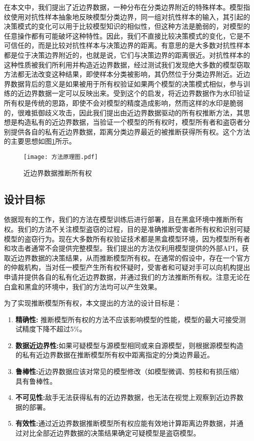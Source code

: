 在本文中，我们提出了近边界数据，一种分布在分类边界附近的特殊样本。模型指纹\cite{cao2021ipguard}使用对抗性样本抽象地反映模型分类边界，同一组对抗性样本的输入，其引起的决策模式的变化可以用于比较模型知识的相似性，但这种方法是脆弱的，对模型的任意操作都有可能破坏这种特性。因此，我们不直接比较决策模式的变化，它是不可信任的，而是比较对抗性样本与决策边界的距离。有意思的是大多数对抗性样本都是位于决策边界附近的，也就是说，它们与决策边界的距离很近。对抗性样本的这种性质被我们所利用并构造近边界数据，经过测试我们发现绝大多数的模型窃取方法都无法改变这种结果，即使样本分类被影响，其仍然位于分类边界附近。近边界数据背后的意义是如果被用于所有权验证如果两个模型的决策模式相似，参与训练的近边界数据一定可以反映出来。受到这个的启发，将近边界数据作为水印验证所有权是传统的思路，即使不会对模型的精度造成影响，然而这样的水印是脆弱的，很难抵御歧义攻击，因此我们提出由近边界数据驱动的所有权推断方法，其思想是构造私有的近边界数据，当验证一个模型的所有权时，模型所有者和盗窃者分别提供各自的私有近边界数据，距离分类边界最近的被推断获得所有权。这个方法的主要思想如图\ref{方法原理图}所示。
\begin{figure}[htbp]%
	\centering
	\texttt{[image: 方法原理图.pdf]}
	\setlength{\abovecaptionskip}{5mm} %
	\caption{近边界数据推断所有权}
	\label{方法原理图}
\end {figure}

\subsection{设计目标}

依据现有的工作，我们的方法在模型训练后进行部署，且在黑盒环境中推断所有权。我们的方法不关注模型盗窃的过程，目的是准确推断受害者所有权和识别可疑模型的盗窃行为。现在大多数所有权验证技术都是黑盒模型环境，因为模型所有者和攻击者通常不会提供完整模型。我们提出的方法仅利用模型提供的外部API，获取近边界数据的决策结果，从而推断模型所有权。在通常的假设中，存在一个官方的仲裁机构，当对任一模型产生所有权怀疑时，受害者和可疑对手可以向机构提出申请并提供各自的私有化近边界数据，并通过我们的方法推断所有权。注意无论在白盒和黑盒的环境中，我们的方法均可以产生效果。

为了实现推断模型所有权，本文提出的方法的设计目标是：
\begin{enumerate}
	\renewcommand{\labelenumi}{\theenumi)}
	\item \textbf{精确性:} 推断模型所有权的方法不应该影响模型的性能，模型的最大可接受测试精度下降不超过5\%。
	\item \textbf{数据近边界性:}如果可疑模型与源模型相同或来自源模型，则根据源模型构造的私有近边界数据在推断模型所有权中距离指定的分类边界最近。
	\item \textbf{鲁棒性:}近边界数据应该对常见的模型修改（如模型微调、剪枝和有损压缩）具有鲁棒性。
	\item \textbf{不可见性:}敌手无法获得私有的近边界数据，也无法在视觉上观察到近边界数据的部署。
	\item \textbf{有效性:}通过近边界数据推断模型所有权应能有效地计算距离边界数据，并通过对比全部近边界数据的决策结果确定可疑模型是盗窃模型。
\end{enumerate}

